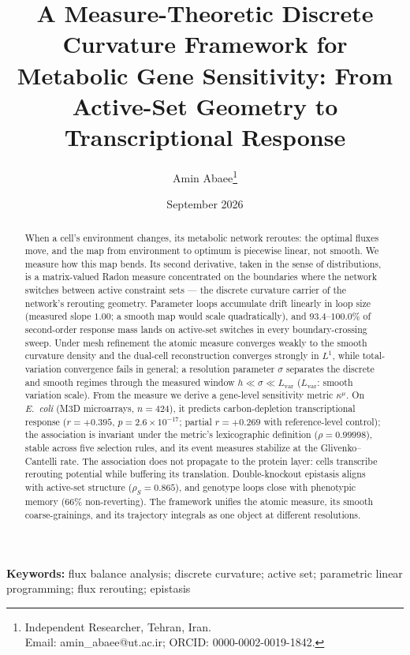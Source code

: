 \documentclass[11pt,a4paper]{article}
\title{A Measure-Theoretic Discrete Curvature Framework for Metabolic
       Gene Sensitivity: From Active-Set Geometry to Transcriptional
       Response}
\author{Amin Abaee\thanks{Independent Researcher, Tehran, Iran.\\
  Email: amin\_abaee@ut.ac.ir; ORCID: 0000-0002-0019-1842.}}
\date{September 2026}
\theoremstyle{plain}
\theoremstyle{definition}
\theoremstyle{remark}
\newcommand{\kmu}{\kappa^{\mu}}
\begin{document}
\linenumbers
\maketitle

\begin{abstract}
\noindent
When a cell's environment changes, its metabolic network reroutes: the
optimal fluxes move, and the map from environment to optimum is
piecewise linear, not smooth. We measure how this
map bends. Its second derivative, taken in the sense of distributions,
is a matrix-valued Radon measure concentrated on the boundaries
where the network switches between active constraint sets --- the
discrete curvature carrier of the network's
rerouting geometry. Parameter loops accumulate drift linearly in loop
size (measured slope $1.00$; a smooth map would scale
quadratically), and $93.4$--$100.0\%$ of second-order response mass
lands on active-set switches in every boundary-crossing sweep. Under
mesh refinement the atomic measure converges weakly to the smooth
curvature density and the dual-cell reconstruction converges strongly
in $L^1$, while total-variation convergence fails in general; a
resolution parameter $\sigma$ separates the discrete and smooth regimes
through the measured window $h \ll \sigma \ll L_{\mathrm{var}}$
($L_{\mathrm{var}}$: smooth variation scale). From the measure we derive a
gene-level sensitivity metric $\kmu$. On \emph{E.~coli} (M3D
microarrays, $n=424$), it predicts carbon-depletion transcriptional
response ($r = +0.395$, $p = 2.6 \times 10^{-17}$; partial $r = +0.269$
with reference-level control); the association is invariant under the
metric's lexicographic definition ($\rho = 0.99998$), stable across
five selection rules, and its event measures stabilize at the
Glivenko--Cantelli rate. The association does not propagate to the
protein layer: cells transcribe rerouting potential while buffering
its translation. Double-knockout epistasis aligns with active-set
structure ($\rho_S = 0.865$), and genotype loops close with
phenotypic memory ($66\%$ non-reverting). The framework unifies the
atomic measure, its smooth coarse-grainings, and its trajectory
integrals as one object at different
resolutions.
\end{abstract}

\medskip
\noindent\textbf{Keywords:} flux balance analysis; discrete curvature;
active set; parametric linear programming; flux rerouting; epistasis

\bigskip

\end{document}
